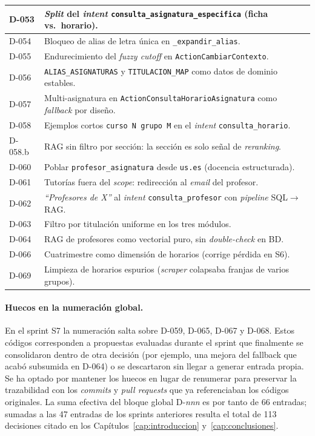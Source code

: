 \begin{longtable}{|p{1.3cm}|>{\raggedright\arraybackslash}p{12cm}|}
D-053 & \textit{Split} del \textit{intent} \texttt{consulta\_asignatura\_especifica} (ficha vs.~horario). \\ \hline
D-054 & Bloqueo de alias de letra única en \texttt{\_expandir\_alias}. \\ \hline
D-055 & Endurecimiento del \textit{fuzzy cutoff} en \texttt{ActionCambiarContexto}. \\ \hline
D-056 & \texttt{ALIAS\_ASIGNATURAS} y \texttt{TITULACION\_MAP} como datos de dominio estables. \\ \hline
D-057 & Multi-asignatura en \texttt{ActionConsultaHorarioAsignatura} como \textit{fallback} por diseño. \\ \hline
D-058 & Ejemplos cortos \texttt{curso N grupo M} en el \textit{intent} \texttt{consulta\_horario}. \\ \hline
D-058.b & RAG sin filtro por sección: la sección es solo señal de \textit{reranking}. \\ \hline
D-060 & Poblar \texttt{profesor\_asignatura} desde \texttt{us.es} (docencia estructurada). \\ \hline
D-061 & Tutorías fuera del \textit{scope}: redirección al \textit{email} del profesor. \\ \hline
D-062 & \textit{``Profesores de X''} al \textit{intent} \texttt{consulta\_profesor} con \textit{pipeline} SQL$\rightarrow$RAG. \\ \hline
D-063 & Filtro por titulación uniforme en los tres módulos. \\ \hline
D-064 & RAG de profesores como vectorial puro, sin \textit{double-check} en BD. \\ \hline
D-066 & Cuatrimestre como dimensión de horarios (corrige pérdida en S6). \\ \hline
D-069 & Limpieza de horarios espurios (\textit{scraper} colapsaba franjas de varios grupos). \\ \hline
\end{longtable}

\paragraph{Huecos en la numeración global.} En el sprint S7 la numeración salta sobre D-059, D-065, D-067 y D-068. Estos códigos corresponden a propuestas evaluadas durante el sprint que finalmente se consolidaron dentro de otra decisión (por ejemplo, una mejora del fallback que acabó subsumida en D-064) o se descartaron sin llegar a generar entrada propia. Se ha optado por mantener los huecos en lugar de renumerar para preservar la trazabilidad con los \textit{commits} y \textit{pull requests} que ya referenciaban los códigos originales. La suma efectiva del bloque global D-\textit{nnn} es por tanto de 66 entradas; sumadas a las 47 entradas de los sprints anteriores resulta el total de 113 decisiones citado en los Capítulos~\ref{cap:introduccion} y~\ref{cap:conclusiones}.

